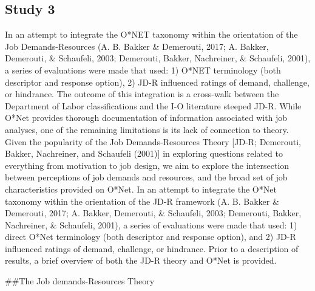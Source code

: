\documentclass[
  english,
  man]{apa6}
\begin{document}
\hypertarget{study-3}{%
\subsection{Study 3}\label{study-3}}

In an attempt to integrate the O*NET taxonomy within the orientation of the Job Demands-Resources (A. B. Bakker \& Demerouti, 2017; A. Bakker, Demerouti, \& Schaufeli, 2003; Demerouti, Bakker, Nachreiner, \& Schaufeli, 2001), a series of evaluations were made that used: 1) O*NET terminology (both descriptor and response option), 2) JD-R influenced ratings of demand, challenge, or hindrance. The outcome of this integration is a cross-walk between the Department of Labor classifications and the I-O literature steeped JD-R. While O*Net provides thorough documentation of information associated with job analyses, one of the remaining limitations is its lack of connection to theory. Given the popularity of the Job Demands-Resources Theory {[}JD-R; Demerouti, Bakker, Nachreiner, and Schaufeli (2001){]} in exploring questions related to everything from motivation to job design, we aim to explore the intersection between perceptions of job demands and resources, and the broad set of job characteristics provided on O*Net. In an attempt to integrate the O*Net taxonomy within the orientation of the JD-R framework (A. B. Bakker \& Demerouti, 2017; A. Bakker, Demerouti, \& Schaufeli, 2003; Demerouti, Bakker, Nachreiner, \& Schaufeli, 2001), a series of evaluations were made that used: 1) direct O*Net terminology (both descriptor and response option), and 2) JD-R influenced ratings of demand, challenge, or hindrance. Prior to a description of results, a brief overview of both the JD-R theory and O*Net is provided.

\#\#The Job demands-Resources Theory
\end{document}
